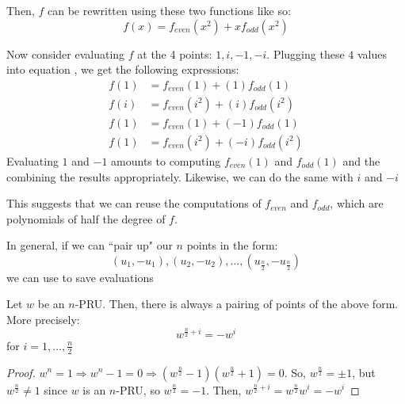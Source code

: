 Then, $f$ can be rewritten using these two functions like so:
\begin{equation}\label{eq:lec6-function-decompose}
    f(x) = f_{even}(x^2) + xf_{odd}(x^2)
\end{equation}

Now consider evaluating $f$ at the 4 points: $1, i, -1, -i$.
Plugging these $4$ values into equation , we get the following expressions:
\begin{align*}
    f(1) &= f_{even}(1) + (1)f_{odd}(1) \\
    f(i) &= f_{even}(i^2) + (i)f_{odd}(i^2) \\
    f(1) &= f_{even}(1) + (-1)f_{odd}(1) \\
    f(1) &= f_{even}(i^2) + (-i)f_{odd}(i^2)
\end{align*}
Evaluating $1$ and $-1$ amounts to computing $f_{even}(1)$ and $f_{odd}(1)$ and the combining the results appropriately.
Likewise, we can do the same with $i$ and $-i$

This suggests that we can reuse the computations of $f_{even}$ and $f_{odd}$, which are polynomials of half the degree of $f$.

In general, if we can ``pair up" our $n$ points in the form:
\begin{equation*}
    (u_1, -u_1), (u_2, -u_2), \ldots, (u_{\frac{n}{2}}, -u_{\frac{n}{2}})
\end{equation*}
we can use  to save evaluations

\begin{lemma}{}{}
    Let $w$ be an $n$-PRU. 
    Then, there is always a pairing of points of the above form.
    More precisely:
    \begin{equation*}
        w^{\frac{n}{2} + i} = -w^i
    \end{equation*}
    for $i = 1, \ldots, \frac{n}{2}$
\end{lemma}
\begin{proof}
    $w^n = 1 \Rightarrow w^n - 1 = 0 \Rightarrow \left(w^{\frac{n}{2}} - 1 \right)\left(w^{\frac{n}{2}} + 1\right) = 0$.
    So, $w^{\frac{n}{2}} = \pm 1$, but $w^{\frac{n}{2}} \neq 1$ since $w$ is an $n$-PRU, so $w^{\frac{n}{2}} = -1$.
    Then, $w^{\frac{n}{2} + i} = w^{\frac{n}{2}}w^i = -w^i$
\end{proof}

